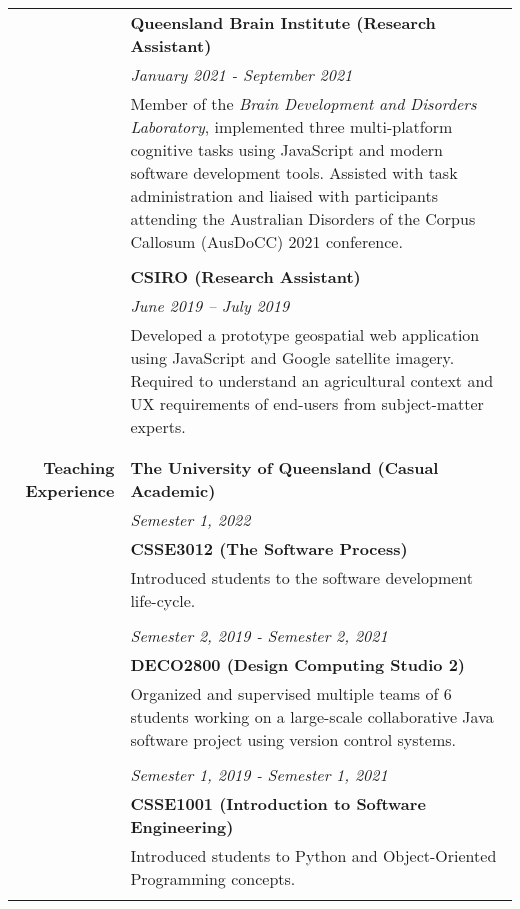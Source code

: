 \documentclass{article}
\begin{document}
\begin{longtable}{r | p{13cm}}
											& \large\textbf{Queensland Brain Institute (Research Assistant)} \\
											& \textit{January 2021 - September 2021} \\
											& Member of the \textit{Brain Development and Disorders Laboratory}, implemented three multi-platform cognitive tasks using JavaScript and modern software development tools. Assisted with task administration and liaised with participants attending the Australian Disorders of the Corpus Callosum (AusDoCC) 2021 conference. \\ 
											& \\

											& \large\textbf{CSIRO (Research Assistant)} \\
	 										& \textit{June 2019 – July 2019} \\
	 										& Developed a prototype geospatial web application using JavaScript and Google satellite imagery. Required to understand an agricultural context and UX requirements of end-users from subject-matter experts. \\
	 										& \\
	 										\hline \\

		\large\textbf{Teaching Experience}	& \large\textbf{The University of Queensland (Casual Academic)} \\
											& \textit{Semester 1, 2022} \\
											& \textbf{CSSE3012 (The Software Process)} \\
											& Introduced students to the software development life-cycle. \\
											& \\

											& \textit{Semester 2, 2019 - Semester 2, 2021} \\
											& \textbf{DECO2800 (Design Computing Studio 2)} \\
											& Organized and supervised multiple teams of 6 students working on a large-scale collaborative Java software project using version control systems. \\
											& \\
											
											& \textit{Semester 1, 2019 - Semester 1, 2021 } \\
											& \textbf{CSSE1001 (Introduction to Software Engineering)} \\
											& Introduced students to Python and Object-Oriented Programming concepts. \\
											& \\
											

\end{longtable}
\end{document}
